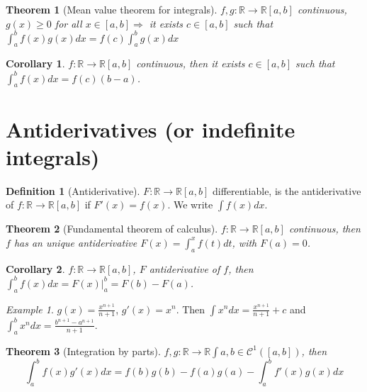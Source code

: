 \documentclass{article}
\newcommand{\Ar}{\Rightarrow}
\newcommand{\fOnR}[1]{#1 : \mathbb{R} \rightarrow \mathbb{R}}
\newcommand{\intcc}[1]{\left[#1\right]}
\theoremstyle{definition}
\newtheorem{definition}{Definition}[section]
\theoremstyle{definition}
\theoremstyle{plain}
\newtheorem{theorem}{Theorem}[section]
\theoremstyle{plain}
\newtheorem{corollary}{Corollary}[theorem]
\theoremstyle{plain}
\theoremstyle{plain}
\theoremstyle{definition}
\theoremstyle{remark}
\theoremstyle{remark}
\theoremstyle{remark}
\newtheorem{examplet}{Example}[theorem]
\theoremstyle{remark}
\newcommand{\C}{\mathcal{C}}
\begin{document}
\begin{theorem}[Mean value theorem for integrals]
  $\fOnR{f,g}{\intcc{a,b}}$ continuous, $g(x) \geq 0$ for all $x \in \intcc{a,b} \Ar$ it exists $c \in \intcc{a,b}$ such that $\int_a^b f(x)g(x) dx = f(c) \int_a^b g(x) dx$
\end{theorem}


\begin{corollary}
  $\fOnR{f}{\intcc{a,b}}$ continuous, then it exists $c \in \intcc{a,b}$ such that $\int_a^b f(x) dx = f(c) (b-a)$.
\end{corollary}



\section{Antiderivatives (or indefinite integrals)}


\begin{definition}[Antiderivative]
  $\fOnR{F}{\intcc{a,b}}$ differentiable, is the antiderivative of $\fOnR{f}{\intcc{a,b}}$ if $F'(x) = f(x)$. We write $\int f(x) dx$.
\end{definition}


\begin{theorem}[Fundamental theorem of calculus]
  $\fOnR{f}{\intcc{a,b}}$ continuous, then $f$ has an unique antiderivative $F(x) = \int_a^x f(t) dt$, with $F(a) = 0$.
\end{theorem}


\begin{corollary}
  $\fOnR{f}{\intcc{a,b}}$, $F$ antiderivative of $f$, then $\int_a^b f(x) dx = F(x) |_a^b = F(b) - F(a)$.
\end{corollary}


\begin{examplet}
  $g(x) = \frac{x^{n+1}}{n+1}$, $g'(x) = x^n$. Then $\int x^n dx = \frac{x^{n+1}}{n+1} + c$ and $\int_a^b x^n dx = \frac{b^{n+1} - a^{n+1}}{n+1}$.
\end{examplet}


\begin{theorem}[Integration by parts]
  $\fOnR{f,g}{\int{a,b}} \in \C^1(\intcc{a,b})$, then
  \[
  \int_a^b f(x) g'(x) dx = f(b)g(b) - f(a)g(a) - \int_a^b f'(x)g(x) dx
  \]
\end{theorem}
\end{document}
